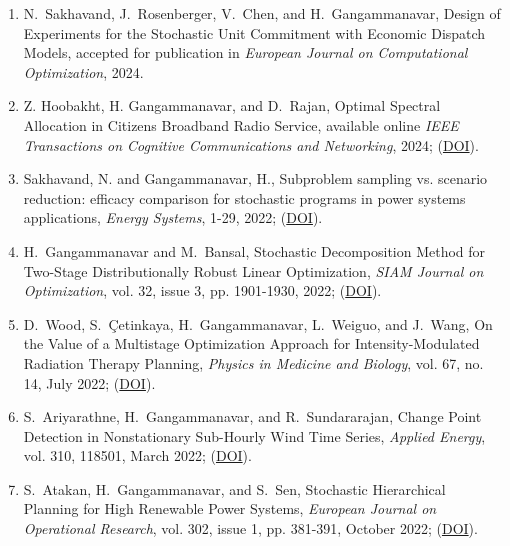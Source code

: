 \documentclass[hyperref, margin]{myResume}
\begin{document}
\begin{resume}
\begin{enumerate}[label=J\arabic*., leftmargin=*]
	\item N.\ Sakhavand\footnotemark[3], J.\ Rosenberger, V.\ Chen, and H.\ Gangammanavar, Design of Experiments for the Stochastic Unit Commitment with Economic Dispatch Models, accepted for publication in \textit{European Journal on Computational Optimization}, 2024. 

	\item Z. Hoobakht\footnotemark[3], H. Gangammanavar, and D.\ Rajan, Optimal Spectral Allocation in Citizens Broadband Radio Service, available online \textit{IEEE Transactions on Cognitive Communications and Networking}, 2024; (\href{https://ieeexplore.ieee.org/document/10490154}{DOI}).
	
	\item Sakhavand, N. and Gangammanavar, H., Subproblem sampling vs. scenario reduction: efficacy comparison for stochastic programs in power systems applications, \textit{Energy Systems}, 1-29, 2022; (\href{https://doi.org/10.1007/s12667-022-00558-9}{DOI}).

	\item H.\ Gangammanavar and M.\ Bansal, Stochastic Decomposition Method for Two-Stage Distributionally Robust Linear Optimization, \textit{SIAM Journal on Optimization}, vol. 32, issue 3, pp. 1901-1930, 2022; (\href{https://doi.org/10.1137/20M1378600}{DOI}).
	
	\item D.\ Wood\footnotemark[3], S.\ \c{C}etinkaya, H.\ Gangammanavar, L.\ Weiguo, and J.\ Wang, On the Value of a Multistage Optimization Approach for Intensity-Modulated Radiation Therapy Planning, \textit{Physics in Medicine and Biology}, vol. 67, no. 14, July 2022; (\href{https://doi.org/10.1088/1361-6560/ac7a8a}{DOI}).

	\item S.\ Ariyarathne\footnotemark[1], H.\ Gangammanavar, and R.\ Sundararajan, Change Point Detection in Nonstationary Sub-Hourly Wind Time Series, \textit{Applied Energy}, vol. 310, 118501, March 2022; (\href{https://doi.org/10.1016/j.apenergy.2021.118501}{DOI}).
	
	\item S.\ Atakan, H.\ Gangammanavar, and S.\ Sen, Stochastic Hierarchical Planning for High Renewable Power Systems, \textit{European Journal on Operational Research}, vol. 302, issue 1, pp. 381-391, October 2022; (\href{https://doi.org/10.1016/j.ejor.2021.12.042}{DOI}).
	

\end{enumerate}
\end{resume}
\end{document}
